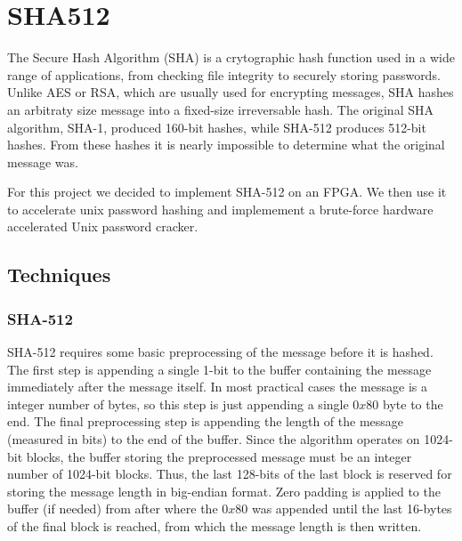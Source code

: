 \section{SHA512}
The Secure Hash Algorithm (SHA) is a crytographic hash function used in a wide range of applications, from checking
file integrity to securely storing passwords. Unlike AES or RSA, which are usually used for
encrypting messages, SHA hashes an arbitraty size message into a fixed-size irreversable hash.
The original SHA algorithm, SHA-1, produced 160-bit hashes, while SHA-512
produces 512-bit hashes. From these hashes it is nearly impossible to determine
what the original message was.

For this project we decided to implement SHA-512 on an FPGA.
We then use it to accelerate unix password hashing and implemement
a brute-force hardware accelerated Unix password cracker.

\subsection{Techniques}
\subsubsection{SHA-512}
SHA-512 requires some basic preprocessing of the message before it is hashed. The first
step is appending a single 1-bit to the buffer containing the message immediately after the message itself.
In most practical cases the message is a integer number of bytes, so this step is just appending
a single $0x80$ byte to the end. The final preprocessing step is appending the
length of the message (measured in bits) to the end of the buffer.
Since the algorithm operates on 1024-bit blocks, the buffer storing the preprocessed message
must be an integer number of 1024-bit blocks. Thus, the last 128-bits of the last block
is reserved for storing the message length in big-endian format. Zero padding is
applied to the buffer (if needed) from after where the $0x80$ was appended until the last 16-bytes
of the final block is reached, from which the message length is then written.


